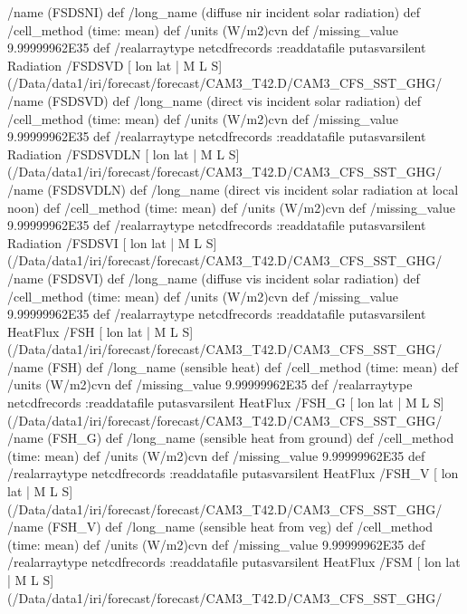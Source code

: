 \begin{ingrid}
{/name (FSDSNI) def
 /long_name (diffuse nir incident solar radiation) def
 /cell_method (time: mean) def
 /units (W/m2)cvn def
 /missing_value 9.99999962E35 def
 /realarraytype netcdfrecords :readdatafile
}putasvarsilent
Radiation /FSDSVD{
[ lon lat | M L S] (/Data/data1/iri/forecast/forecast/CAM3_T42.D/CAM3_CFS_SST_GHG/%
/name (FSDSVD) def
 /long_name (direct vis incident solar radiation) def
 /cell_method (time: mean) def
 /units (W/m2)cvn def
 /missing_value 9.99999962E35 def
 /realarraytype netcdfrecords :readdatafile
}putasvarsilent
Radiation /FSDSVDLN{
[ lon lat | M L S] (/Data/data1/iri/forecast/forecast/CAM3_T42.D/CAM3_CFS_SST_GHG/%
/name (FSDSVDLN) def
 /long_name (direct vis incident solar radiation at local noon) def
 /cell_method (time: mean) def
 /units (W/m2)cvn def
 /missing_value 9.99999962E35 def
 /realarraytype netcdfrecords :readdatafile
}putasvarsilent
Radiation /FSDSVI{
[ lon lat | M L S] (/Data/data1/iri/forecast/forecast/CAM3_T42.D/CAM3_CFS_SST_GHG/%
/name (FSDSVI) def
 /long_name (diffuse vis incident solar radiation) def
 /cell_method (time: mean) def
 /units (W/m2)cvn def
 /missing_value 9.99999962E35 def
 /realarraytype netcdfrecords :readdatafile
}putasvarsilent
HeatFlux /FSH{
[ lon lat | M L S] (/Data/data1/iri/forecast/forecast/CAM3_T42.D/CAM3_CFS_SST_GHG/%
/name (FSH) def
 /long_name (sensible heat) def
 /cell_method (time: mean) def
 /units (W/m2)cvn def
 /missing_value 9.99999962E35 def
 /realarraytype netcdfrecords :readdatafile
}putasvarsilent
HeatFlux /FSH_G{
[ lon lat | M L S] (/Data/data1/iri/forecast/forecast/CAM3_T42.D/CAM3_CFS_SST_GHG/%
/name (FSH_G) def
 /long_name (sensible heat from ground) def
 /cell_method (time: mean) def
 /units (W/m2)cvn def
 /missing_value 9.99999962E35 def
 /realarraytype netcdfrecords :readdatafile
}putasvarsilent
HeatFlux /FSH_V{
[ lon lat | M L S] (/Data/data1/iri/forecast/forecast/CAM3_T42.D/CAM3_CFS_SST_GHG/%
/name (FSH_V) def
 /long_name (sensible heat from veg) def
 /cell_method (time: mean) def
 /units (W/m2)cvn def
 /missing_value 9.99999962E35 def
 /realarraytype netcdfrecords :readdatafile
}putasvarsilent
HeatFlux /FSM{
[ lon lat | M L S] (/Data/data1/iri/forecast/forecast/CAM3_T42.D/CAM3_CFS_SST_GHG/%
}
\end{ingrid}
